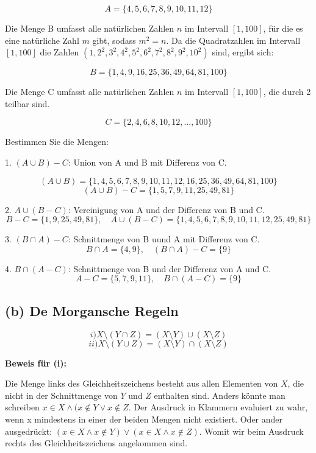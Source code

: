 \documentclass[11pt]{article}
\begin{document}
\[
A = \{4, 5, 6, 7, 8, 9, 10, 11, 12\}
\]

Die Menge B umfasst alle natürlichen Zahlen \( n \) im Intervall \( [1, 100] \), für die es eine natürliche Zahl \( m \) gibt, sodass \( m^2 = n \).
Da die Quadratzahlen im Intervall \( [1, 100] \) die Zahlen \(( 1, 2^2, 3^2, 4^2, 5^2, 6^2, 7^2, 8^2, 9^2, 10^2 )\) sind, ergibt sich:

\[
B = \{1, 4, 9, 16, 25, 36, 49, 64, 81, 100\}
\]

Die Menge C umfasst alle natürlichen Zahlen \( n \) im Intervall \( [1, 100] \), die durch 2 teilbar sind.

\[
C = \{2, 4, 6, 8, 10, 12, \dots, 100\}
\]

Bestimmen Sie die Mengen:

1. \( (A \cup B) - C \): Union von A und B mit Differenz von C.

\[
(A \cup B) = \{1, 4, 5, 6, 7, 8, 9, 10, 11, 12, 16, 25, 36, 49, 64, 81, 100\}
\]
\[
(A \cup B) - C = \{1, 5, 7, 9, 11, 25, 49, 81\}
\]

2. \( A \cup (B - C) \): Vereinigung von A und der Differenz von B und C.
\[
B - C = \{1, 9, 25, 49, 81\}, \quad A \cup (B - C) = \{1, 4, 5, 6, 7, 8, 9, 10, 11, 12, 25, 49, 81\}
\]

3. \( (B \cap A) - C \): Schnittmenge von B uund A mit Differenz von C.
\[
B \cap A = \{4, 9\}, \quad (B \cap A) - C = \{9\}
\]

4. \( B \cap (A - C) \): Schnittmenge von B und der Differenz von A und C.
\[
A - C = \{5, 7, 9, 11\}, \quad B \cap (A - C) = \{9\}
\]

\subsection*{(b) De Morgansche Regeln}

\[
i) X \setminus (Y \cap Z) = (X \setminus Y) \cup (X \setminus Z)
\]
\[
ii) X \setminus (Y \cup Z) = (X \setminus Y) \cap (X \setminus Z)
\]

\textbf{Beweis für (i):}

Die Menge links des Gleichheitszeichens besteht aus allen Elementen von \( X \), die nicht in der Schnittmenge von \( Y \) und \( Z \) enthalten sind.
    Anders könnte man schreiben \( x \in X \land (x \notin Y \lor x \notin Z\). Der Ausdruck in Klammern evaluiert zu wahr, wenn x mindestens in einer der beiden Mengen nicht existiert.
    Oder ander ausgedrückt: \( (x \in X \land x \notin Y) \lor  (x \in X \land x \notin Z )\). Womit wir beim Ausdruck rechts des Gleichheitszeichens angekommen sind.
\end{document}

